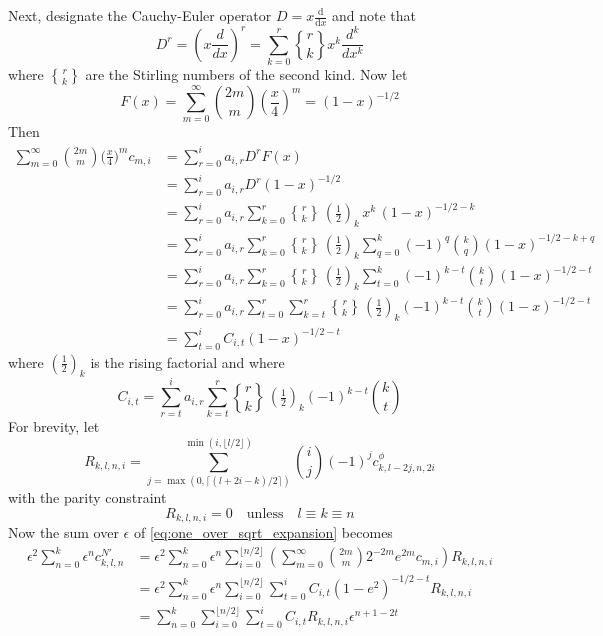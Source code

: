 \documentclass[a4paper]{amsart}
\newcommand{\stirlingsecond}[2]{%
  \genfrac{\{}{\}}{0pt}{}{#1}{#2}}
\begin{document}
Next, designate the Cauchy-Euler operator $D=x\frac{\text{d}}{\text{d} x}$ and note that
\begin{equation*}
D^r=\left(x\frac{d}{dx}\right)^r=\sum_{k=0}^r \stirlingsecond{r}{k}x^k\frac{d^k}{dx^k}
\end{equation*}
where $\stirlingsecond{r}{k}$ are the Stirling numbers of the second kind. Now let
\begin{equation*}
F(x) = \sum_{m=0}^\infty \binom{2m}{m}\left(\frac{x}{4}\right)^m = (1-x)^{-1/2}
\end{equation*}
Then
\begin{align*}
\sum_{m=0}^\infty \binom{2m}{m}\Big(\frac{x}{4}\Big)^m c_{m,i}
&=\sum_{r=0}^i a_{i,r}D^r F(x)\\
&=\sum_{r=0}^i a_{i,r}D^r (1-x)^{-1/2}\\
&=\sum_{r=0}^i a_{i,r}\sum_{k=0}^r \stirlingsecond{r}{k}\,(\tfrac12)_k\,x^k\,(1-x)^{-1/2-k}\\
&=\sum_{r=0}^i a_{i,r}\sum_{k=0}^r \stirlingsecond{r}{k}\,(\tfrac12)_k\sum_{q=0}^k (-1)^q\binom{k}{q}(1-x)^{-1/2-k+q}\\
&=\sum_{r=0}^i a_{i,r}\sum_{k=0}^r \stirlingsecond{r}{k}\,(\tfrac12)_k\sum_{t=0}^k (-1)^{k-t}\binom{k}{t}(1-x)^{-1/2-t}\\
&=\sum_{r=0}^i a_{i,r}\sum_{t=0}^r\sum_{k=t}^r \stirlingsecond{r}{k}\,(\tfrac12)_k(-1)^{k-t}\binom{k}{t}(1-x)^{-1/2-t}\\
&=\sum_{t=0}^i C_{i,t}(1-x)^{-1/2-t}
\end{align*}
where $(\tfrac12)_k$ is the rising factorial and where
\begin{equation*}
C_{i,t}=\sum_{r=t}^i a_{i,r}\sum_{k=t}^r \stirlingsecond{r}{k}\,(\tfrac12)_k(-1)^{k-t}\binom{k}{t}
\end{equation*}
For brevity, let
\begin{equation*}
R_{k,l,n,i}=\sum_{j=\max(0,\lceil (l+2i-k)/2\rceil)}^{\min(i,\lfloor l/2\rfloor)}\binom{i}{j}(-1)^jc^{\phi}_{k,l-2j,n,2i}
\end{equation*}
with the parity constraint
\begin{equation}\label{eq:R_parity}
R_{k,l,n,i} = 0\quad\text{unless}\quad l\equiv k\equiv n
\end{equation}
Now the sum over $\epsilon$ of \eqref{eq:one_over_sqrt_expansion} becomes
\begin{align*}
\epsilon^2\sum_{n=0}^k\epsilon^nc^{N'}_{k,l,n}&=\epsilon^2\sum_{n=0}^k\epsilon^n\sum_{i=0}^{\lfloor n/2\rfloor}\left(\sum_{m=0}^{\infty}\binom{2m}{m}2^{-2m}e^{2m}c_{m,i}\right)R_{k,l,n,i}\\
&=\epsilon^2\sum_{n=0}^k\epsilon^n
\sum_{i=0}^{\lfloor n/2\rfloor}
\sum_{t=0}^{i}
C_{i,t}(1-e^2)^{-1/2-t}R_{k,l,n,i}\\
&=\sum_{n=0}^k\sum_{i=0}^{\lfloor n/2\rfloor}\sum_{t=0}^iC_{i,t}R_{k,l,n,i}\epsilon^{n+1-2t}
\end{align*}
\end{document}

